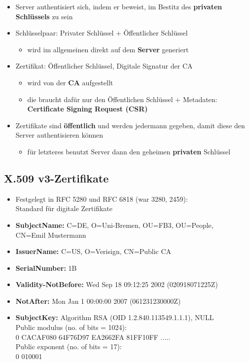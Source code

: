 \documentclass[openany]{book}
\begin{document}
\begin{itemize}
    \item Server authentisiert sich, indem er beweist, im Bestitz des \textbf{privaten Schlüssels} zu sein
    \item Schlüsselpaar: Privater Schlüssel + Öffentlicher Schlüssel
    \begin{itemize}
        \item wird im allgemeinen direkt auf dem \textbf{Server} generiert
    \end{itemize}
    \item Zertifikat: Öffentlicher Schlüssel, Digitale Signatur der CA
    \begin{itemize}
        \item wird von der \textbf{CA} aufgestellt
        \item die braucht dafür nur den Öffentlichen Schlüssel + Metadaten: \\ \textbf{Certificate Signing Request (CSR)} 
    \end{itemize}
    \item Zertifikate sind \textbf{öffentlich} und werden jedermann gegeben, damit diese den Server authentisieren können
    \begin{itemize}
        \item für letzteres benutzt Server dann den geheimen \textbf{privaten} Schlüssel
    \end{itemize}
\end{itemize}

\subsection{X.509 v3-Zertifikate}

\begin{itemize}
    \item Festgelegt in RFC 5280 und RFC 6818 (war 3280, 2459):\\ Standard für digitale Zertifikate
    \item \textbf{SubjectName:} C=DE, O=Uni-Bremen, OU=FB3, OU=People,\\ CN=Emil Mustermann
    \item \textbf{IssuerName:} C=US, O=Verisign, CN=Public CA
    \item \textbf{SerialNumber:} 1B
    \item \textbf{Validity-NotBefore:} Wed Sep 18 09:12:25 2002 (020918071225Z)
    \item \textbf{NotAfter:} Mon Jan 1 00:00:00 2007 (061231230000Z)
    \item \textbf{SubjectKey:} Algorithm RSA (OID 1.2.840.113549.1.1.1), NULL\\ Public modulus (no. of bits = 1024):\\ 0 CACAF080 64F76D97 EA2662FA 81FF10FF .....\\ Public exponent (no. of bits = 17):\\ 0 010001
\end{itemize}
\end{document}
